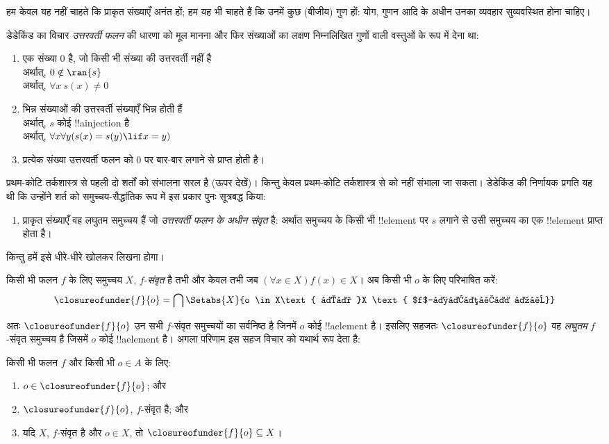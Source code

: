 \documentclass[../../../include/open-logic-section]{subfiles}
\begin{document}

हम केवल यह नहीं चाहते कि प्राकृत संख्याएँ अनंत हों; हम यह भी चाहते हैं कि
उनमें कुछ (बीजीय) गुण हों: योग, गुणन आदि के अधीन उनका व्यवहार सुव्यवस्थित होना
चाहिए।

डेडेकिंड का विचार \emph{उत्तरवर्ती फलन} की धारणा को मूल मानना और फिर संख्याओं
का लक्षण निम्नलिखित गुणों वाली वस्तुओं के रूप में देना था:
\begin{enumerate}
	\item एक संख्या $0$ है, जो किसी भी संख्या की उत्तरवर्ती नहीं है
	\\अर्थात्, $0 \notin \ran{s}$
	\\अर्थात्, $\forall x\ s(x) \neq 0$
	\item भिन्न संख्याओं की उत्तरवर्ती संख्याएँ भिन्न होती हैं
	\\अर्थात्, $s$ कोई !!a{injection} है
	\\अर्थात्, $\forall x \forall y (s(x) = s(y) \lif x = y)$
	\item{} प्रत्येक संख्या उत्तरवर्ती फलन को
	$0$ पर बार-बार लगाने से प्राप्त होती है।
\end{enumerate}
प्रथम-कोटि तर्कशास्त्र से पहली दो शर्तों को संभालना सरल है (ऊपर देखें)। किन्तु
केवल प्रथम-कोटि तर्कशास्त्र से  को नहीं संभाला जा
सकता। डेडेकिंड की निर्णायक प्रगति यह थी कि उन्होंने शर्त
 को समुच्चय-सैद्धांतिक रूप में इस प्रकार पुनः
सूत्रबद्ध किया:
\begin{enumerate}
	\item[3$'$.] प्राकृत संख्याएँ वह लघुतम समुच्चय हैं जो \emph{उत्तरवर्ती
	फलन के अधीन संवृत} है: अर्थात समुच्चय के किसी भी !!{element} पर $s$ लगाने
	से उसी समुच्चय का एक !!{element} प्राप्त होता है।
\end{enumerate}
किन्तु हमें इसे धीरे-धीरे खोलकर लिखना होगा।

\begin{defn}
	किसी भी फलन $f$ के लिए समुच्चय $X$, $f$-\emph{संवृत} है तभी और केवल तभी
	जब $(\forall x \in X)f(x) \in X$। अब किसी भी $o$ के लिए परिभाषित करें:
	$$\closureofunder{f}{o} = \bigcap\Setabs{X}{o \in X\text{ और }X
\text{ $f$-संवृत है}}$$
\end{defn}

अतः $\closureofunder{f}{o}$ उन सभी $f$-संवृत समुच्चयों का सर्वनिष्ठ है जिनमें
$o$ कोई !!a{element} है। इसलिए सहजतः $\closureofunder{f}{o}$ वह
\emph{लघुतम} $f$-संवृत समुच्चय है जिसमें $o$ कोई !!a{element} है। अगला परिणाम
इस सहज विचार को यथार्थ रूप देता है:
\begin{lem}
	किसी भी फलन $f$ और किसी भी $o \in A$ के लिए:
	\begin{enumerate}
		\item{} $o \in \closureofunder{f}{o}$; और
		\item{} $\closureofunder{f}{o}$, $f$-संवृत है; और
		\item{} यदि $X$, $f$-संवृत है और $o \in
		X$, तो $\closureofunder{f}{o} \subseteq X$।
	\end{enumerate}
\end{lem}
\end{document}
